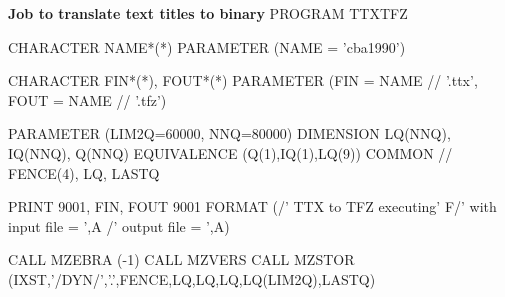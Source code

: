 {\bf Job to translate text titles to binary}
\bvc
      PROGRAM TTXTFZ

      CHARACTER    NAME*(*)
      PARAMETER   (NAME = 'cba1990')

      CHARACTER    FIN*(*), FOUT*(*)
      PARAMETER   (FIN = NAME // '.ttx',  FOUT = NAME // '.tfz')

      PARAMETER   (LIM2Q=60000, NNQ=80000)
      DIMENSION    LQ(NNQ), IQ(NNQ), Q(NNQ)
      EQUIVALENCE (Q(1),IQ(1),LQ(9))
      COMMON //    FENCE(4), LQ, LASTQ

      PRINT 9001, FIN, FOUT
 9001 FORMAT (/' TTX to TFZ executing'
     F/' with  input file = ',A /'      output file = ',A)

      CALL MZEBRA (-1)
      CALL MZVERS
      CALL MZSTOR (IXST,'/DYN/','.',FENCE,LQ,LQ,LQ,LQ(LIM2Q),LASTQ)

